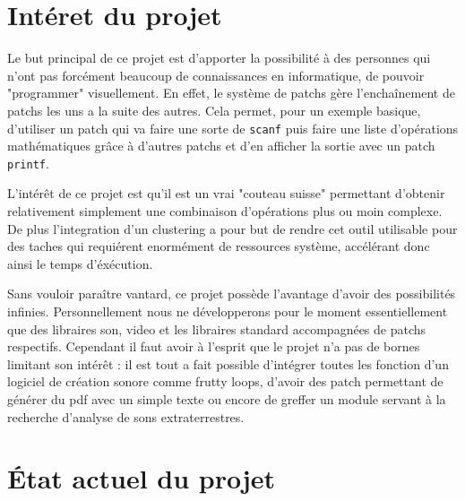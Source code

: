 \documentclass[14pt,a4paper]{article}
\begin{document}
\newpage
\section{Int\'eret du projet}

Le but principal de ce projet est d'apporter la possibilit\'e \`a des
 personnes qui n'ont pas forc\'ement beaucoup de connaissances en
 informatique, de pouvoir "programmer" visuellement. En effet,
 le syst\`eme de patchs g\`ere l'encha\^inement de patchs les uns a la
 suite des autres. Cela permet, pour un exemple basique, d'utiliser un
 patch qui va faire une sorte de {\tt scanf} puis faire une liste
 d'op\'erations math\'ematiques gr\^ace \`a d'autres patchs et d'en
 afficher la sortie avec un patch \texttt{printf}.\\
\par
L'int\'er\^et de ce projet est qu'il est un vrai "couteau suisse"
 permettant d'obtenir relativement simplement une combinaison
 d'op\'erations plus ou moin complexe.
 De plus l'integration d'un clustering a pour but de rendre cet outil
 utilisable pour des taches qui requi\'erent enorm\'ement de ressources
 syst\`eme, acc\'el\'erant donc ainsi le temps d'\'ex\'ecution.\\
\par
Sans vouloir para\^itre vantard, ce projet poss\`ede l'avantage d'avoir des
 possibilit\'es infinies. Personnellement nous ne d\'evelopperons
 pour le moment essentiellement que des libraires son, video et les
 libraires standard accompagn\'ees de patchs respectifs. Cependant il faut
 avoir \`a l'esprit que le projet n'a pas de bornes limitant son
 int\'er\^et : il est tout a fait possible d'int\'egrer toutes les
 fonction d'un logiciel de cr\'eation sonore comme frutty loops,
 d'avoir des patch permettant de g\'en\'erer du pdf avec un simple texte
 ou encore de greffer un module servant \`a la recherche d'analyse de sons
 extraterrestres. 

\newpage
\section{\'Etat actuel du projet}
\end{document}
